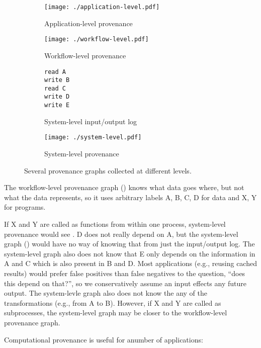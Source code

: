 \begin{figure}
\centering
\begin{subfigure}[b]{0.23\textwidth}
\centering
\texttt{[image: ./application-level.pdf]}
\caption{Application-level provenance}
\end{subfigure}
\hfill
\begin{subfigure}[b]{0.23\textwidth}
\centering
\texttt{[image: ./workflow-level.pdf]}
\caption{Workflow-level provenance}
\label{subfigure:workflow-level-graph}
\end{subfigure}
\hfill
\begin{subfigure}[b]{0.23\textwidth}
\begin{verbatim}
read A
write B
read C
write D
write E
\end{verbatim}
\caption{System-level input/output log}
\label{subfigure:system-level-log}
\end{subfigure}
\hfill
\begin{subfigure}[b]{0.23\textwidth}
\centering
\texttt{[image: ./system-level.pdf]}
\caption{System-level provenance}
\label{subfigure:system-level-graph}
\end{subfigure}
\caption{Several provenance graphs collected at different levels.}
\label{figure:graphs}
\end{figure}

The workflow-level provenance graph () knows what data goes where, but not what the data represents, so it uses arbitrary labels A, B, C, D for data and X, Y for programs.

If X and Y are called as functions from within one process, system-level provenance would see .
D does not really depend on A, but the system-level graph () would have no way of knowing that from just the input/output log.
The system-level graph also does not know that E only depends on the information in A and C which is also present in B and D.
Most applications (e.g., reusing cached results) would prefer false positives than false negatives to the question, ``does this depend on that?'', so we conservatively assume an input effects any future output.
The system-levle graph also does not know the any of the transformations (e.g., from A to B).
However, if X and Y are called as subprocesses, the system-level graph may be closer to the workflow-level provenance graph.

Computational provenance is useful for anumber of applications:

